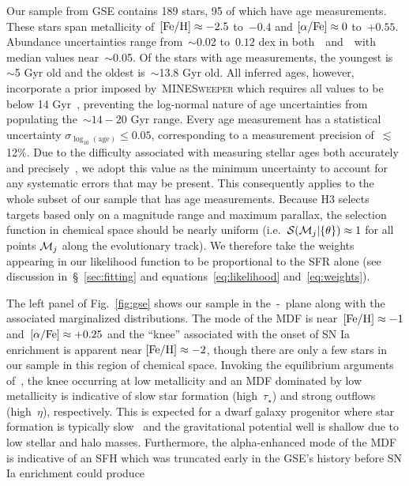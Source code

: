 \documentclass[ms.tex]{subfiles}
\begin{document}
Our sample from GSE contains 189 stars, 95 of which have age measurements.
These stars span metallicity of~$\text{[Fe/H]} \approx -2.5$ to~$-0.4$ and
$\text{[$\alpha$/Fe]} \approx 0$ to~$+0.55$.
Abundance uncertainties range from~$\sim$0.02 to~$0.12$ dex in
both~\feh~and~\afe~with median values near~$\sim$0.05.
Of the stars with age measurements, the youngest is~$\sim$5 Gyr old and the
oldest is~$\sim$13.8 Gyr old.
All inferred ages, however, incorporate a prior imposed by~\textsc{MINESweeper}
which requires all values to be below 14 Gyr~\citep{Cargile2020}, preventing
the log-normal nature of age uncertainties from populating the~$\sim14 - 20$
Gyr range.
Every age measurement has a statistical uncertainty
$\sigma_{\log_{10}(\text{age})} \leq 0.05$, corresponding to a measurement
precision of~$\lesssim$12\%.
Due to the difficulty associated with measuring stellar ages both accurately
and precisely~\citep{Soderblom2010, Chaplin2013}, we adopt this value as the
minimum uncertainty to account for any systematic errors that may be present.
This consequently applies to the whole subset of our sample that has age
measurements.
Because H3 selects targets based only on a magnitude range and maximum
parallax, the selection function in chemical space should be nearly uniform
(i.e.~$\mathcal{S}(\mathcal{M}_j | \{\theta\}) \approx 1$ for all points
$\mathcal{M}_j$ along the evolutionary track).
We therefore take the weights appearing in our likelihood function to be
proportional to the SFR alone (see discussion in~\S~\ref{sec:fitting} and
equations~\ref{eq:likelihood} and~\ref{eq:weights}).
\par
The left panel of Fig.~\ref{fig:gse} shows our sample in the~\afe-\feh~plane
along with the associated marginalized distributions.
The mode of the MDF is near~$\text{[Fe/H]} \approx -1$ and~$\text{[$\alpha$/Fe]} \approx + 0.25$ and
the ``knee'' associated with the onset of SN Ia enrichment is apparent near
$\text{[Fe/H]} \approx -2$, though there are only a few stars in our sample in this
region of chemical space.
Invoking the equilibrium arguments of~\citet{Weinberg2017}, the knee occurring
at low metallicity and an MDF dominated by low metallicity is indicative of
slow star formation (high~$\tau_\star$) and strong outflows (high~$\eta$),
respectively.
This is expected for a dwarf galaxy progenitor where star formation is
typically slow~\citep[e.g.][]{Hudson2015} and the gravitational potential well
is shallow due to low stellar and halo masses.
Furthermore, the alpha-enhanced mode of the MDF is indicative of an SFH which
was truncated early in the GSE's history before SN Ia enrichment could produce
\end{document}
